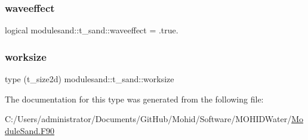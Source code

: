 \subsubsection{\texorpdfstring{waveeffect}{waveeffect}}
{\footnotesize\ttfamily logical modulesand\+::t\+\_\+sand\+::waveeffect = .true.\hspace{0.3cm}{\ttfamily [private]}}

\mbox{\label{structmodulesand_1_1t__sand_a7ba4fd2f7d96c34bd7cf75c54ded46d3}} 
\subsubsection{\texorpdfstring{worksize}{worksize}}
{\footnotesize\ttfamily type (t\+\_\+size2d) modulesand\+::t\+\_\+sand\+::worksize\hspace{0.3cm}{\ttfamily [private]}}



The documentation for this type was generated from the following file\+:\begin{DoxyCompactItemize}
\item 
C\+:/\+Users/administrator/\+Documents/\+Git\+Hub/\+Mohid/\+Software/\+M\+O\+H\+I\+D\+Water/\mbox{\hyperlink{_module_sand_8_f90}{Module\+Sand.\+F90}}\end{DoxyCompactItemize}
